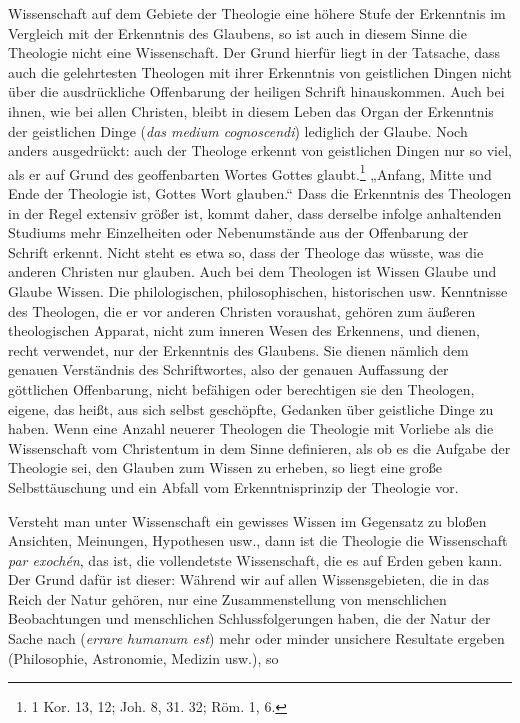 Wissenschaft auf dem Gebiete der Theologie eine höhere Stufe der Erkenntnis im Vergleich mit der Erkenntnis des Glaubens, so ist auch in diesem Sinne die Theologie nicht eine Wissenschaft. Der Grund hierfür liegt in der Tatsache, dass auch die gelehrtesten Theologen mit ihrer Erkenntnis von geistlichen Dingen nicht über die ausdrückliche Offenbarung der heiligen Schrift hinauskommen. Auch bei ihnen, wie bei allen Christen, bleibt in diesem Leben das Organ der Erkenntnis der geistlichen Dinge (\emph{das medium cognoscendi}) lediglich der Glaube. Noch anders ausgedrückt: auch der Theologe erkennt von geistlichen Dingen nur so viel, als er auf Grund des geoffenbarten Wortes Gottes glaubt.\footnote{1 Kor. 13, 12; Joh. 8, 31. 32; Röm. 1, 6.} „Anfang, Mitte und Ende der Theologie ist, Gottes Wort glauben.“ Dass die Erkenntnis des Theologen in der Regel extensiv größer ist, kommt daher, dass derselbe infolge anhaltenden Studiums mehr Einzelheiten oder Nebenumstände aus der Offenbarung der Schrift erkennt. Nicht steht es etwa so, dass der Theologe das wüsste, was die anderen Christen nur glauben. Auch bei dem Theologen ist Wissen Glaube und Glaube Wissen. Die philologischen, philosophischen, historischen usw. Kenntnisse des Theologen, die er vor anderen Christen voraushat, gehören zum äußeren theologischen Apparat, nicht zum inneren Wesen des Erkennens, und dienen, recht verwendet, nur der Erkenntnis des Glaubens. Sie dienen nämlich dem genauen Verständnis des Schriftwortes, also der genauen Auffassung der göttlichen Offenbarung, nicht befähigen oder berechtigen sie den Theologen, eigene, das heißt, aus sich selbst geschöpfte, Gedanken über geistliche Dinge zu haben. Wenn eine Anzahl neuerer Theologen die Theologie mit Vorliebe als die Wissenschaft vom Christentum in dem Sinne definieren, als ob es die Aufgabe der Theologie sei, den Glauben zum Wissen zu erheben, so liegt eine große Selbsttäuschung und ein Abfall vom Erkenntnisprinzip der Theologie vor.\par Versteht man unter Wissenschaft ein gewisses Wissen im Gegensatz zu bloßen Ansichten, Meinungen, Hypothesen usw., dann ist die Theologie die Wissenschaft \emph{par exochén}, das ist, die vollendetste Wissenschaft, die es auf Erden geben kann. Der Grund dafür ist dieser: Während wir auf allen Wissensgebieten, die in das Reich der Natur gehören, nur eine Zusammenstellung von menschlichen Beobachtungen und menschlichen Schlussfolgerungen haben, die der Natur der Sache nach (\emph{errare humanum est}) mehr oder minder unsichere Resultate ergeben (Philosophie, Astronomie, Medizin usw.), so